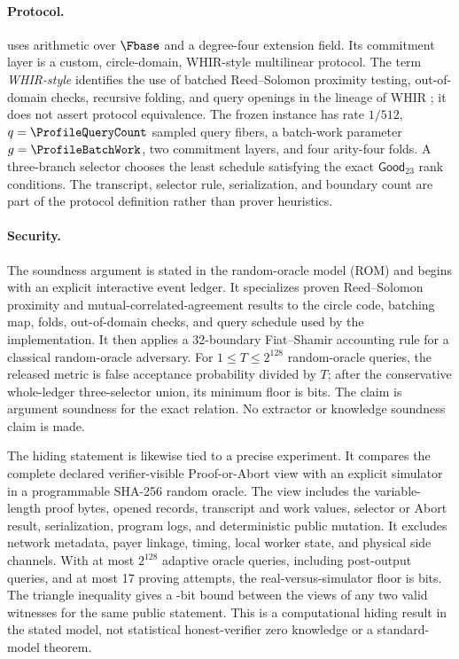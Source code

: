 \paragraph{Protocol.}
\Profile{} uses arithmetic over $\Fbase$ and a degree-four extension field.
Its commitment layer is a custom, circle-domain, WHIR-style multilinear
protocol.  The term \emph{WHIR-style} identifies the use of batched
Reed--Solomon proximity testing, out-of-domain checks, recursive folding, and
query openings in the lineage of WHIR
\cite{ArnonChiesaFenziYogev2025WHIR}; it does not assert
protocol equivalence.  The frozen instance has rate $1/512$,
$q=\ProfileQueryCount$ sampled query fibers, a batch-work parameter
$g=\ProfileBatchWork$, two commitment layers, and four arity-four folds.  A
three-branch selector chooses the least schedule satisfying the exact
\(\mathsf{Good}_{23}\) rank conditions.  The transcript, selector rule,
serialization,
and boundary count are part of the protocol definition rather than prover
heuristics.

\paragraph{Security.}
The soundness argument is stated in the random-oracle model (ROM) and begins
with an explicit interactive event ledger.  It
specializes proven Reed--Solomon proximity and mutual-correlated-agreement
results to the circle code, batching map, folds, out-of-domain checks, and
query schedule used by the implementation.  It then applies a 32-boundary
Fiat--Shamir accounting rule for a classical random-oracle adversary.  For
$1\leq T\leq 2^{128}$ random-oracle queries, the released metric is false
acceptance probability divided by $T$; after the conservative whole-ledger
three-selector union, its minimum floor is \ProfileSoundnessBits{} bits.  The
claim is argument soundness for the exact relation.  No extractor or knowledge
soundness claim is made.

The hiding statement is likewise tied to a precise experiment.  It compares
the complete declared verifier-visible Proof-or-Abort view with an explicit
simulator in a programmable SHA-256 random oracle.  The view includes the
variable-length proof bytes, opened records, transcript and work values,
selector or Abort result, serialization, program logs, and deterministic
public mutation.  It excludes network metadata, payer linkage, timing, local
worker state, and physical side channels.  With at most $2^{128}$ adaptive
oracle queries, including post-output queries, and at most 17 proving
attempts, the real-versus-simulator floor is \ProfileSimulationBits{} bits.
The triangle inequality gives a \ProfilePairwiseBits-bit bound between the
views of any two valid witnesses for the same public statement.  This is a
computational hiding result in the stated model, not statistical honest-verifier
zero knowledge or a standard-model theorem.


